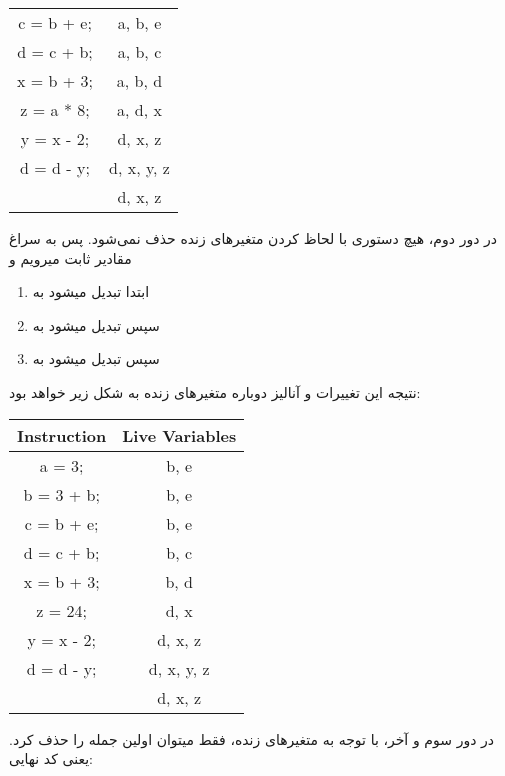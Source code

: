 {\begin{enumerate}
\begin{latin}
\begin{table}[H]
\begin{tabular}{c|c}
					c = b + e; & {a, b, e}\\
					d = c + b; & {a, b, c}\\
					x = b + 3; & {a, b, d}\\
					z = a * 8; & {a, d, x}\\
					y = x - 2;  & {d, x, z}\\
					d = d - y;  & {d, x, y, z}\\
							& {d, x, z}\\
				\end{tabular} 
			\end{table} 
		\end{latin}
در دور دوم، هیچ دستوری با لحاظ کردن متغیرهای زنده حذف نمی‌شود. پس به سراغ مقادیر ثابت میرویم و 
		\begin{enumerate}
			\item
ابتدا  تبدیل میشود به 
			\item
سپس  تبدیل میشود به 
			\item
سپس  تبدیل میشود به 
		\end{enumerate}
نتیجه این تغییرات و آنالیز دوباره متغیرهای زنده به شکل زیر خواهد بود:
		\begin{latin}
			\begin{table}[H]
				\begin{tabular}{c|c}
					Instruction & Live Variables\\
					\hline
					a = 3; & {b, e} \\
					b = 3 + b; & {b, e}\\
					c = b + e; & {b, e}\\
					d = c + b; & {b, c}\\
					x = b + 3; & {b, d}\\
					z = 24; & {d, x}\\
					y = x - 2;  & {d, x, z}\\
					d = d - y;  & {d, x, y, z}\\
							& {d, x, z}\\
				\end{tabular} 
			\end{table} 
		\end{latin}
در دور سوم و آخر، با توجه به متغیرهای زنده، فقط میتوان اولین جمله را حذف کرد. یعنی 
\newline
کد نهایی:
	\lr{}
\end{enumerate}
}

